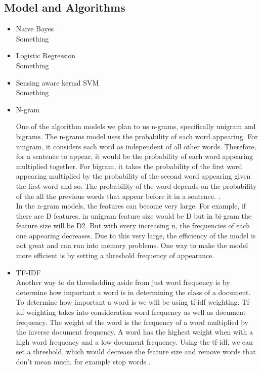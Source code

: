 \documentclass[a4paper, 11pt]{article}
\begin{document}
\subsection{Model and Algorithms}
\begin{itemize}
	\item Naive Bayes \\
	Something
	\item Logistic Regression \\
	Something
	\item Sensing aware kernal SVM\\
	Something
	\item N-gram
	\par One of the algorithm models we plan to us n-grams, specifically unigram and bigrams.  The n-grams model uses the probability of each word appearing. For unigram, it considers each word as independent of all other words. Therefore, for a sentence to appear, it would be the probability of each word appearing multiplied together. For bigram, it takes the probability of the first word appearing multiplied by the probability of the second word appearing given the first word and so. The probability of the word depends on the probability of the all the previous words that appear before it in a sentence. \cite{song1999general}. \\
	
	In the n-gram models, the features can become very large. For example, if there are D features, in unigram feature size would be D but in bi-gram the feature size will be D2. But with every increasing n, the frequencies of each one appearing decreases. Due to this very large, the efficiency of the model is not great and can run into memory problems. One way to make the model more efficient is by setting a threshold frequency of appearance\cite{furnkranz1998study}.  \\
	
	\item TF-IDF\\
	Another way to do thresholding aside from just word frequency is by determine how important a word is in determining the class of a document. To determine how important a word is we will be using tf-idf weighting. Tf-idf weighting takes into consideration word frequency as well as document frequency. The weight of the word is the frequency of a word multiplied by the inverse document frequency. A word has the highest weight when with a high word frequency and a low document frequency. Using the tf-idf, we can set a threshold, which would decrease the feature size and remove words that don’t mean much, for example stop words \cite{schutze2008introduction}.
	
\end{itemize}
\end{document}
